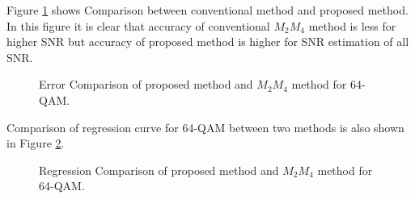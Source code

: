 \documentclass[12pt]{report}
\begin{document}
Figure \ref{fig:error_compare_64qam} shows Comparison between conventional method and proposed method. In this figure it is clear that accuracy of conventional $M_2M_4$ method is less for higher SNR but accuracy of proposed method is higher for SNR estimation of all SNR. 
\begin{figure}[htbp]
	\caption{Error Comparison of proposed method and $M_2 M_4$ method for 64-QAM. }
	\label{fig:error_compare_64qam}
\end{figure}

Comparison of regression curve for 64-QAM between two methods is also shown in Figure \ref{fig:regression_compare_64qam}.

\begin{figure}[htbp]
	\caption{Regression Comparison of proposed method and $M_2 M_4$ method for 64-QAM. }
	\label{fig:regression_compare_64qam}
\end{figure}
\iffalse
\end{document}
